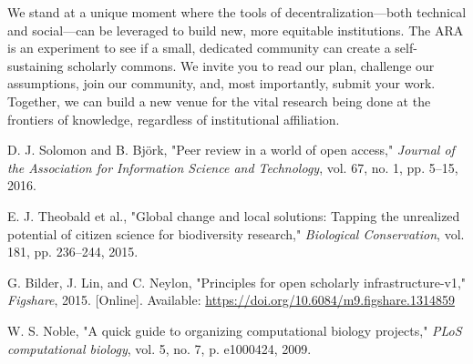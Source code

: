 \documentclass[conference, compsoc, 11pt]{IEEEtran}
\begin{document}
We stand at a unique moment where the tools of decentralization—both technical and social—can be leveraged to build new, more equitable institutions. The ARA is an experiment to see if a small, dedicated community can create a self-sustaining scholarly commons. We invite you to read our plan, challenge our assumptions, join our community, and, most importantly, submit your work. Together, we can build a new venue for the vital research being done at the frontiers of knowledge, regardless of institutional affiliation.


\begin{thebibliography}{1}

D. J. Solomon and B. Bj{\"o}rk, "Peer review in a world of open access," \textit{Journal of the Association for Information Science and Technology}, vol. 67, no. 1, pp. 5--15, 2016.

E. J. Theobald et al., "Global change and local solutions: Tapping the unrealized potential of citizen science for biodiversity research," \textit{Biological Conservation}, vol. 181, pp. 236--244, 2015.

G. Bilder, J. Lin, and C. Neylon, "Principles for open scholarly infrastructure-v1," \textit{Figshare}, 2015. [Online]. Available: \url{https://doi.org/10.6084/m9.figshare.1314859}

W. S. Noble, "A quick guide to organizing computational biology projects," \textit{PLoS computational biology}, vol. 5, no. 7, p. e1000424, 2009.

\end{thebibliography}
\end{document}
